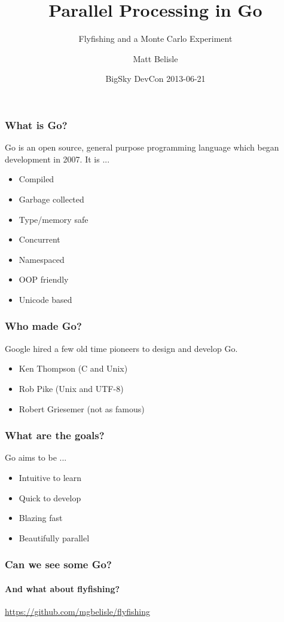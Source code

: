 \documentclass{beamer}
\title{Parallel Processing in Go}
\subtitle{Flyfishing and a Monte Carlo Experiment}
\author{Matt Belisle}
\date{BigSky DevCon 2013-06-21}
\begin{document}
\begin{frame}
  \titlepage
\end{frame}
\begin{frame}
  \frametitle{What is Go?}

  Go is an open source, general purpose programming language which
  began development in 2007.  It is ...
  
  \begin{itemize}
    \item Compiled
    \item Garbage collected
    \item Type/memory safe
    \item Concurrent
    \item Namespaced
    \item OOP friendly
    \item Unicode based
  \end{itemize}
\end{frame}
\begin{frame}
  \frametitle{Who made Go?}

  Google hired a few old time pioneers to design and develop Go.
  
  \begin{itemize}
    \item Ken Thompson (C and Unix)
    \item Rob Pike (Unix and UTF-8)
    \item Robert Griesemer (not as famous)
  \end{itemize}
\end{frame}
\begin{frame}
  \frametitle{What are the goals?}

  Go aims to be ...
  
  \begin{itemize}
    \item Intuitive to learn
    \item Quick to develop
    \item Blazing fast
    \item Beautifully parallel
  \end{itemize}
\end{frame}
\begin{frame}
  \frametitle{Can we see some Go?}
  \framesubtitle{And what about flyfishing?}
  \begin{center}
    \url{https://github.com/mgbelisle/flyfishing}
  \end{center}
\end{frame}
\end{document}

